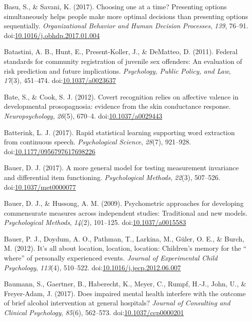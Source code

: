 \documentclass[english,man]{apa6}
\theoremstyle{definition}
\theoremstyle{definition}
\theoremstyle{definition}
\theoremstyle{remark}
\begin{document}
\hypertarget{ref-Basu2017}{}
Basu, S., \& Savani, K. (2017). Choosing one at a time? Presenting
options simultaneously helps people make more optimal decisions than
presenting options sequentially. \emph{Organizational Behavior and Human
Decision Processes}, \emph{139}, 76--91.
doi:\href{https://doi.org/10.1016/j.obhdp.2017.01.004}{10.1016/j.obhdp.2017.01.004}

\hypertarget{ref-Batastini2011}{}
Batastini, A. B., Hunt, E., Present-Koller, J., \& DeMatteo, D. (2011).
Federal standards for community registration of juvenile sex offenders:
An evaluation of risk prediction and future implications.
\emph{Psychology, Public Policy, and Law}, \emph{17}(3), 451--474.
doi:\href{https://doi.org/10.1037/a0023637}{10.1037/a0023637}

\hypertarget{ref-Bate2012}{}
Bate, S., \& Cook, S. J. (2012). Covert recognition relies on affective
valence in developmental prosopagnosia: evidence from the skin
conductance response. \emph{Neuropsychology}, \emph{26}(5), 670--4.
doi:\href{https://doi.org/10.1037/a0029443}{10.1037/a0029443}

\hypertarget{ref-Batterink2017}{}
Batterink, L. J. (2017). Rapid statistical learning supporting word
extraction from continuous speech. \emph{Psychological Science},
\emph{28}(7), 921--928.
doi:\href{https://doi.org/10.1177/0956797617698226}{10.1177/0956797617698226}

\hypertarget{ref-Bauer2016}{}
Bauer, D. J. (2017). A more general model for testing measurement
invariance and differential item functioning. \emph{Psychological
Methods}, \emph{22}(3), 507--526.
doi:\href{https://doi.org/10.1037/met0000077}{10.1037/met0000077}

\hypertarget{ref-Bauer2009}{}
Bauer, D. J., \& Hussong, A. M. (2009). Psychometric approaches for
developing commensurate measures across independent studies: Traditional
and new models. \emph{Psychological Methods}, \emph{14}(2), 101--125.
doi:\href{https://doi.org/10.1037/a0015583}{10.1037/a0015583}

\hypertarget{ref-Bauer2012}{}
Bauer, P. J., Doydum, A. O., Pathman, T., Larkina, M., Güler, O. E., \&
Burch, M. (2012). It's all about location, location, location:
Children's memory for the `` where'' of personally experienced events.
\emph{Journal of Experimental Child Psychology}, \emph{113}(4),
510--522.
doi:\href{https://doi.org/10.1016/j.jecp.2012.06.007}{10.1016/j.jecp.2012.06.007}

\hypertarget{ref-Baumann2017}{}
Baumann, S., Gaertner, B., Haberecht, K., Meyer, C., Rumpf, H.-J., John,
U., \& Freyer-Adam, J. (2017). Does impaired mental health interfere
with the outcome of brief alcohol intervention at general hospitals?
\emph{Journal of Consulting and Clinical Psychology}, \emph{85}(6),
562--573.
doi:\href{https://doi.org/10.1037/ccp0000201}{10.1037/ccp0000201}
\end{document}
